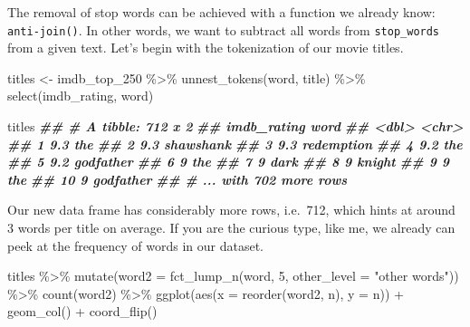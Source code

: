 \documentclass[
]{book}
\newenvironment{Shaded}{\begin{snugshade}}{\end{snugshade}}
\newcommand{\AttributeTok}[1]{\textcolor[rgb]{0.77,0.63,0.00}{#1}}
\newcommand{\DecValTok}[1]{\textcolor[rgb]{0.00,0.00,0.81}{#1}}
\newcommand{\DocumentationTok}[1]{\textcolor[rgb]{0.56,0.35,0.01}{\textbf{\textit{#1}}}}
\newcommand{\FunctionTok}[1]{\textcolor[rgb]{0.00,0.00,0.00}{#1}}
\newcommand{\NormalTok}[1]{#1}
\newcommand{\OtherTok}[1]{\textcolor[rgb]{0.56,0.35,0.01}{#1}}
\newcommand{\SpecialCharTok}[1]{\textcolor[rgb]{0.00,0.00,0.00}{#1}}
\newcommand{\StringTok}[1]{\textcolor[rgb]{0.31,0.60,0.02}{#1}}
\begin{document}
The removal of stop words can be achieved with a function we already know: \texttt{anti-join()}. In other words, we want to subtract all words from \texttt{stop\_words} from a given text. Let's begin with the tokenization of our movie titles.

\begin{Shaded}
\begin{Highlighting}[]
\NormalTok{titles }\OtherTok{\textless{}{-}}
\NormalTok{  imdb\_top\_250 }\SpecialCharTok{\%\textgreater{}\%}
  \FunctionTok{unnest\_tokens}\NormalTok{(word, title) }\SpecialCharTok{\%\textgreater{}\%}
  \FunctionTok{select}\NormalTok{(imdb\_rating, word)}

\NormalTok{titles}
\DocumentationTok{\#\# \# A tibble: 712 x 2}
\DocumentationTok{\#\#    imdb\_rating word      }
\DocumentationTok{\#\#          \textless{}dbl\textgreater{} \textless{}chr\textgreater{}     }
\DocumentationTok{\#\#  1         9.3 the       }
\DocumentationTok{\#\#  2         9.3 shawshank }
\DocumentationTok{\#\#  3         9.3 redemption}
\DocumentationTok{\#\#  4         9.2 the       }
\DocumentationTok{\#\#  5         9.2 godfather }
\DocumentationTok{\#\#  6         9   the       }
\DocumentationTok{\#\#  7         9   dark      }
\DocumentationTok{\#\#  8         9   knight    }
\DocumentationTok{\#\#  9         9   the       }
\DocumentationTok{\#\# 10         9   godfather }
\DocumentationTok{\#\# \# ... with 702 more rows}
\end{Highlighting}
\end{Shaded}

Our new data frame has considerably more rows, i.e.~712, which hints at around 3 words per title on average. If you are the curious type, like me, we already can peek at the frequency of words in our dataset.

\begin{Shaded}
\begin{Highlighting}[]
\NormalTok{titles }\SpecialCharTok{\%\textgreater{}\%}
  \FunctionTok{mutate}\NormalTok{(}\AttributeTok{word2 =} \FunctionTok{fct\_lump\_n}\NormalTok{(word, }\DecValTok{5}\NormalTok{,}
                            \AttributeTok{other\_level =} \StringTok{"other words"}\NormalTok{)) }\SpecialCharTok{\%\textgreater{}\%}
  \FunctionTok{count}\NormalTok{(word2) }\SpecialCharTok{\%\textgreater{}\%}
  \FunctionTok{ggplot}\NormalTok{(}\FunctionTok{aes}\NormalTok{(}\AttributeTok{x =} \FunctionTok{reorder}\NormalTok{(word2, n),}
             \AttributeTok{y =}\NormalTok{ n)) }\SpecialCharTok{+}
  \FunctionTok{geom\_col}\NormalTok{() }\SpecialCharTok{+}
  \FunctionTok{coord\_flip}\NormalTok{()}
\end{Highlighting}
\end{Shaded}
\end{document}
